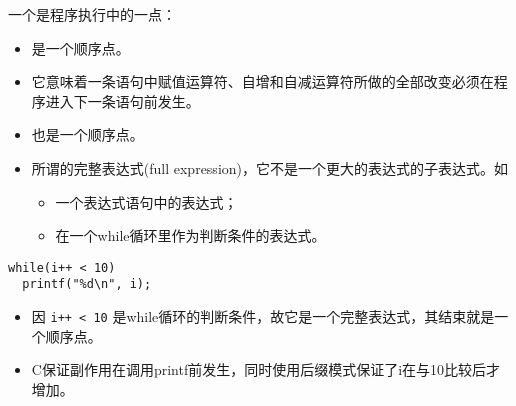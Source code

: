 \begin{frame}[fragile]
一个是程序执行中的一点：

\end{frame}

\begin{frame}[fragile]


\begin{itemize}
\item
  是一个顺序点。 \\[0.1in]
\item[] 它意味着一条语句中赋值运算符、自增和自减运算符所做的全部改变必须在程序进入下一条语句前发生。\\[0.1in]
\item {}也是一个顺序点。\\[0.1in]
\item[] 所谓的完整表达式(full expression)，它不是一个更大的表达式的子表达式。如\\[0.1in]
  \begin{itemize}
  \item 一个表达式语句中的表达式；\\[.1in]
  \item 在一个while循环里作为判断条件的表达式。
  \end{itemize}
\end{itemize}
\end{frame}

\begin{frame}[fragile]

\begin{lstlisting}[frame=no]
while(i++ < 10)
  printf("%d\n", i);
\end{lstlisting}

\begin{itemize}
\item 因 \lstinline|i++ < 10| 是while循环的判断条件，故它是一个完整表达式，其结束就是一个顺序点。\\[0.1in] 
\item C保证副作用在调用printf前发生，同时使用后缀模式保证了i在与10比较后才增加。

\end{itemize}

\end{frame}

